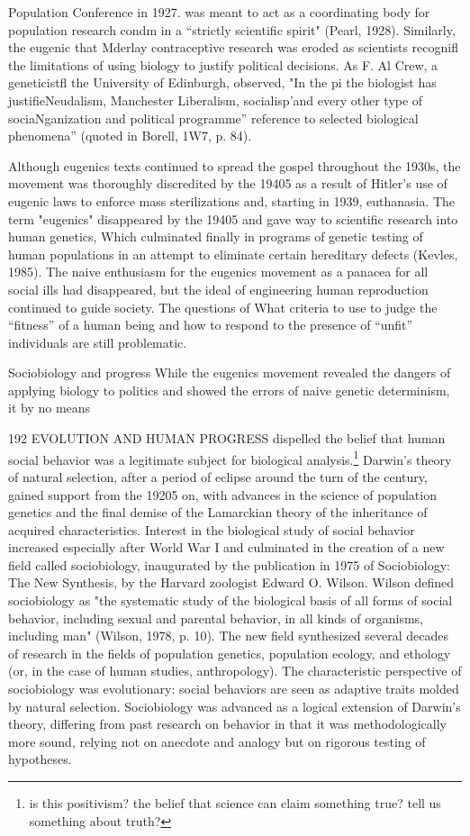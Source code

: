 \documentclass[12pt]{letter}
\begin{document}
Population Conference in 1927. was meant to act as a coordinating body for population research condm in a “strictly scientific spirit" (Pearl, 1928). Similarly, the eugenic that Mderlay contraceptive research was eroded as scientists recognifl the limitations of using biology to justify political decisions. As F. Al Crew, a geneticistfl the University of Edinburgh, observed, "In the pi the biologist has justifieNeudalism, Manchester Liberalism, socialisp’and every other type of sociaNganization and political programme” reference to selected biological phenomena” (quoted in Borell, 1W7, p. 84).

Although eugenics texts continued to spread the gospel throughout the 1930s, the movement was thoroughly discredited by the 19405 as a result of Hitler’s use of eugenic laws to enforce mass sterilizations and, starting in 1939, euthanasia. The term "eugenics" disappeared by the 19405 and gave way to scientific research into human genetics, Which culminated finally in programs of genetic testing of human populations in an attempt to eliminate certain hereditary defects (Kevles, 1985). The naive enthusiasm for the eugenics movement as a panacea for all social ills had disappeared, but the ideal of engineering human reproduction continued to guide society. The questions of What criteria to use to judge the “fitness” of a human being and how to respond to the presence of “unfit” individuals are still problematic.

Sociobiology and progress
While the eugenics movement revealed the dangers of applying biology to politics and showed the errors of naive genetic determinism, it by no means


192 EVOLUTION AND HUMAN PROGRESS
dispelled the belief that human social behavior was a legitimate subject for biological analysis.\footnote{is this positivism? the belief that science can claim something true? tell us something about truth?} Darwin’s theory of natural selection, after a period of eclipse around the turn of the century, gained support from the 19205 on, with advances in the science of population genetics and the final demise of the Lamarckian theory of the inheritance of acquired characteristics. Interest in the biological study of social behavior increased especially after World War I and culminated in the creation of a new field called sociobiology, inaugurated by the publication in 1975 of Sociobiology: The New Synthesis, by the Harvard zoologist Edward O. Wilson. Wilson defined sociobiology as "the systematic study of the biological basis of all forms of social behavior, including sexual and parental behavior, in all kinds of organisms, including man" (Wilson, 1978, p. 10). The new field synthesized several decades of research in the fields of population genetics, population ecology, and ethology (or, in the case of human studies, anthropology). The characteristic perspective of sociobiology was evolutionary: social behaviors are seen as adaptive traits molded by natural selection. Sociobiology was advanced as a logical extension of Darwin’s theory, differing from past research on behavior in that it was methodologically more sound, relying not on anecdote and analogy but on rigorous testing of hypotheses.
\end{document}
